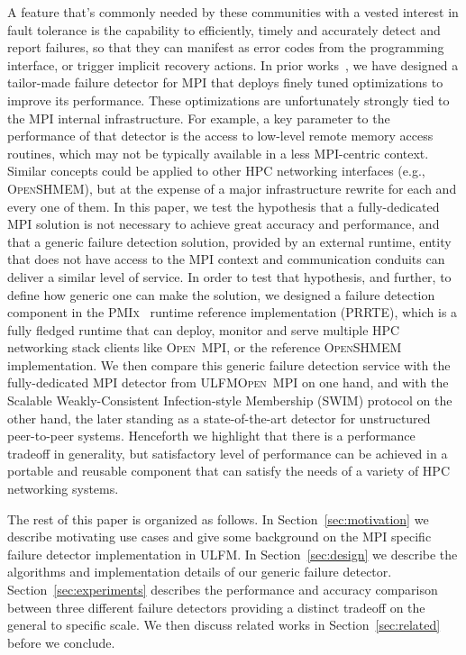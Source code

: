 \documentclass[sigconf]{acmart}
\newcommand{\prrte}[0]{\textsc{PRRTE}\xspace}
\newcommand{\pmix}[0]{\textsc{PMIx}\xspace}
\newcommand{\ompi}[0]{\textsc{Open~MPI}\xspace}
\newcommand{\ulfm}[0]{\textsc{ULFM}\xspace}
\newcommand{\mpi}[0]{\textsc{MPI}\xspace}
\newcommand{\oshmem}[0]{\textsc{OpenSHMEM}\xspace}
\begin{document}
A feature that's commonly needed by these communities with a vested
interest in fault tolerance is the capability to efficiently, timely and
accurately detect and report failures, so that they can manifest as
error codes from the programming interface, or trigger implicit recovery
actions. In prior works~\cite{George16}, we have designed a tailor-made
failure detector for \mpi that deploys finely tuned optimizations to
improve its performance. These optimizations are unfortunately strongly
tied to the \mpi internal infrastructure. For example, a key parameter to 
the performance of that detector is the
access to low-level remote memory access routines, which may not be typically
available in a less \mpi-centric context. Similar concepts could be
applied to other HPC networking interfaces (e.g., \oshmem), but at 
the expense of a major infrastructure rewrite for each and every one of 
them. In this paper, we test the hypothesis that a fully-dedicated \mpi 
solution is not necessary to achieve great accuracy and performance, and 
that a generic failure detection solution, provided by an external runtime, 
entity that does not have access to the \mpi context and communication conduits
can deliver a similar level of service. In order to test that hypothesis, 
and further, to define how generic one can make the solution, we designed 
a failure detection component in the \pmix~\cite{CASTAIN18} runtime reference implementation
(\prrte), which is a fully fledged runtime that can deploy, monitor and 
serve multiple HPC networking stack clients like \ompi, or the 
reference \oshmem implementation. We then compare this generic 
failure detection service with the fully-dedicated \mpi detector from 
\ulfm \ompi on one hand, and with the Scalable Weakly-Consistent Infection-style Membership (SWIM) protocol on the other hand, the later standing
as a state-of-the-art detector for unstructured peer-to-peer systems. Henceforth 
we highlight that there is a performance tradeoff in generality, but 
satisfactory level of performance can be achieved in a portable and reusable 
component that can satisfy the needs of a variety of HPC networking systems. 

The rest of this paper is organized as follows. In Section~\ref{sec:motivation}
we describe motivating use cases and give some background on the \mpi specific 
failure detector implementation in \ulfm. In Section~\ref{sec:design} we describe 
the algorithms and implementation details of our generic failure detector.
Section~\ref{sec:experiments} describes the performance and accuracy comparison
between three different failure detectors providing a distinct tradeoff 
on the general to specific scale. We then discuss related works  in 
Section~\ref{sec:related} before we conclude.
\end{document}
